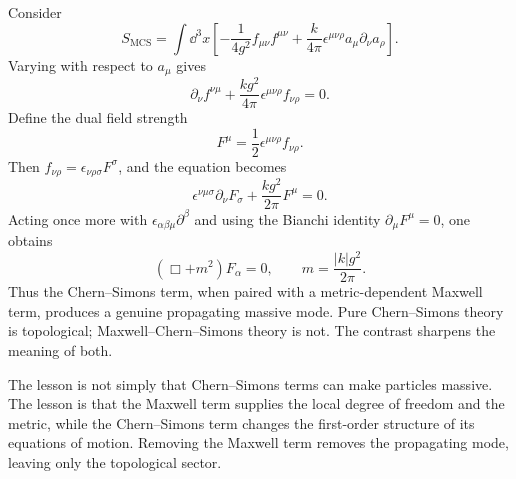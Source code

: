 Consider
\begin{equation}
  S_{\mathrm{MCS}}
  =
  \int\dd^3x
  \left[
  -\frac{1}{4g^2}f_{\mu\nu}f^{\mu\nu}
  +
  \frac{k}{4\pi}\epsilon^{\mu\nu\rho}a_\mu\partial_\nu a_\rho
  \right].
  \label{eq:dense-mcs}
\end{equation}
Varying with respect to $a_\mu$ gives
\begin{equation}
  \partial_\nu f^{\nu\mu}
  +
  \frac{k g^2}{4\pi}
  \epsilon^{\mu\nu\rho}f_{\nu\rho}
  =
  0.
  \label{eq:dense-mcs-eom}
\end{equation}
Define the dual field strength
\begin{equation}
  F^\mu=\frac12\epsilon^{\mu\nu\rho}f_{\nu\rho}.
  \label{eq:dense-mcs-dual}
\end{equation}
Then $f_{\nu\rho}=\epsilon_{\nu\rho\sigma}F^\sigma$, and the equation becomes
\begin{equation}
  \epsilon^{\nu\mu\sigma}\partial_\nu F_\sigma
  +
  \frac{k g^2}{2\pi}F^\mu
  =
  0.
  \label{eq:dense-mcs-first-order}
\end{equation}
Acting once more with $\epsilon_{\alpha\beta\mu}\partial^\beta$ and using the Bianchi identity $\partial_\mu F^\mu=0$, one obtains
\begin{equation}
  (\Box+m^2)F_\alpha=0,
  \qquad
  m=\frac{|k|g^2}{2\pi}.
  \label{eq:dense-mcs-mass}
\end{equation}
Thus the Chern--Simons term, when paired with a metric-dependent Maxwell term, produces a genuine propagating massive mode. Pure Chern--Simons theory is topological; Maxwell--Chern--Simons theory is not. The contrast sharpens the meaning of both.

The lesson is not simply that Chern--Simons terms can make particles massive. The lesson is that the Maxwell term supplies the local degree of freedom and the metric, while the Chern--Simons term changes the first-order structure of its equations of motion. Removing the Maxwell term removes the propagating mode, leaving only the topological sector.
